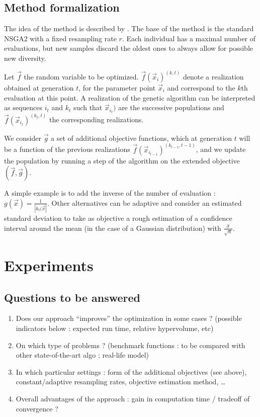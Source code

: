 \subsection{Method formalization}

The idea of the method is described by \cite{pumain2017evaluation}. The base of the method is the standard NSGA2 with a fixed resampling rate $r$. Each individual has a maximal number of evaluations, but new samples discard the oldest ones to always allow for possible new diversity.

Let $\vec{f}$ the random variable to be optimized. $\vec{f}(\vec{x}_{i})^{(k,t)}$ denote a realization obtained at generation $t$, for the parameter point $\vec{x}_i$ and correspond to the $k$th evaluation at this point. A realization of the genetic algorithm can be interpreted as sequences $i_t$ and $k_t$ such that $\vec{x}_{i_t})$ are the successive populations and $\vec{f}(\vec{x}_{i_t})^{(k_t,t)}$ the corresponding realizations.

We consider $\vec{g}$ a set of additional objective functions, which at generation $t$ will be a function of the previous realizations $\vec{f}(\vec{x}_{i_{t-1}})^{(k_{t-1},t-1)}$, and we update the population by running a step of the algorithm on the extended objective $(\vec{f},\vec{g})$.

A simple example is to add the inverse of the number of evaluation : $g(\vec{x}) = \frac{1}{\left|k_t(\vec{x}\right|}$. Other alternatives can be adaptive and consider an estimated standard deviation to take as objective a rough estimation of a confidence interval around the mean (in the case of a Gaussian distribution) with $\frac{\hat{\sigma}}{\sqrt{n}}$.






\section{Experiments}


\subsection{Questions to be answered}

\begin{enumerate}
\item Does our approach ``improves'' the optimization in some cases ? (possible indicators below : expected run time, relative hypervolume, etc)
\item On which type of problems ? (benchmark functions : to be compared with other state-of-the-art algo ; real-life model)
\item In which particular settings : form of the additional objectives (see above), constant/adaptive resampling rates, objective estimation method, \ldots
\item Overall advantages of the approach : gain in computation time / tradeoff of convergence ?
\end{enumerate}


